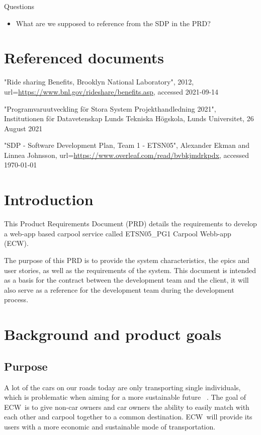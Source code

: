 \documentclass{article}
\newcommand{\name}{ECW\ }
\newcommand{\nameNospace}{ECW}
\begin{document}
Questions
\begin{itemize}
    \item What are we supposed to reference from the SDP in the PRD?
\end{itemize}

\newpage

\section{Referenced documents}
\begin{thebibliography}{widest entry}
     "Ride sharing Benefits, Brooklyn National Laboratory", 2012, url=\url{https://www.bnl.gov/rideshare/benefits.asp}, accessed 2021-09-14
    
     "Programvaruutveckling för Stora System Projekthandledning 2021", Institutionen för Datavetenskap Lunds Tekniska Högskola, Lunds Universitet, 26 August 2021
    
     "SDP - Software Development Plan, Team 1 - ETSN05", Alexander Ekman and Linnea Johnsson, url=\url{https://www.overleaf.com/read/bvbkjmdrkpdx}, accessed \today
    
\end{thebibliography}

\section{Introduction}
This Product Requirements Document (PRD) details the requirements to develop a web-app based carpool service called ETSN05\_PG1 Carpool Webb-app (\nameNospace).

The purpose of this PRD is to provide the system characteristics, the epics and user stories, as well as the requirements of the system. This document is intended as a basis for the contract between the development team and the client, it will also serve as a reference for the development team during the development process.

\section{Background and product goals}
\subsection{Purpose}
A lot of the cars on our roads today are only transporting single individuals, which is problematic when aiming for a more sustainable future ~\cite{BNL}. The goal of \name is to give non-car owners and car owners the ability to easily match with each other and carpool together to a common destination. \name will provide its users with a more economic and sustainable mode of transportation.
\end{document}
